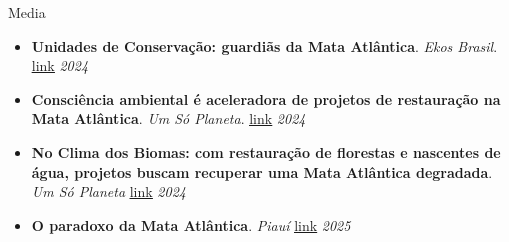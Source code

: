 \documentclass{resume}
\begin{document}
\begin{rSection}{Media}
\begin{itemize}
\item {\bf Unidades de Conservação: guardiãs da Mata Atlântica}. {\it Ekos Brasil}. \href{https://www.ekosbrasil.org/unidades-de-conservacao-guardias-da-mata-atlantica}{\underline{link}} \hfill{\em 2024}
\item {\bf Consciência ambiental é aceleradora de projetos de restauração na Mata Atlântica}. {\it Um Só Planeta}. \href{https://umsoplaneta.globo.com/clima/noticia/2024/09/26/consciencia-ambiental-e-aceleradora-de-projetos-de-restauracao-na-mata-atlantica.ghtml}{\underline{link}} \hfill{\em 2024}
\item {\bf No Clima dos Biomas: com restauração de florestas e nascentes de água, projetos buscam recuperar uma Mata Atlântica degradada}. {\it Um Só Planeta} \href{https://umsoplaneta.globo.com/clima/noticia/2024/09/26/no-clima-dos-biomas-com-restauracao-de-florestas-e-nascentes-de-agua-projetos-buscam-recuperar-uma-mata-atlantica-degradada.ghtml}{\underline{link}} \hfill{\em 2024}
\item {\bf O paradoxo da Mata Atlântica}. {\it Piauí} \href{https://piaui.folha.uol.com.br/paradoxo-mata-atlantica-crescimento/}{\underline{link}} \hfill{\em 2025}
\end{itemize} 


\end{rSection}
\end{document}
